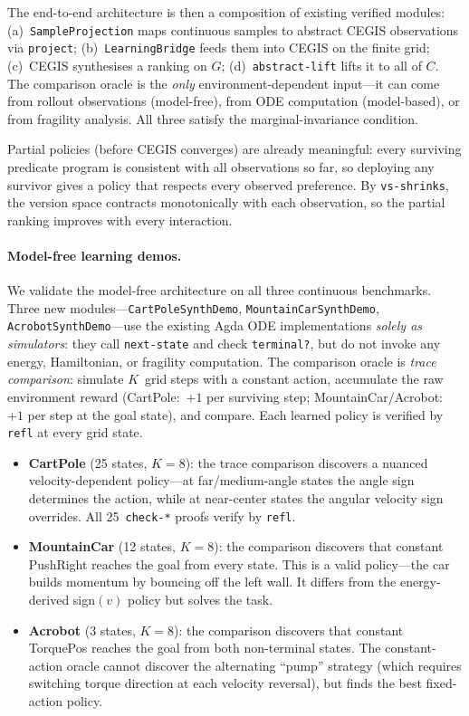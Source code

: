 \documentclass[9pt,a4paper]{article}
\theoremstyle{plain}
\theoremstyle{definition}
\theoremstyle{remark}
\begin{document}
The end-to-end architecture is then a composition of existing verified modules: (a)~\texttt{SampleProjection} maps continuous samples to abstract CEGIS observations via \texttt{project}; (b)~\texttt{LearningBridge} feeds them into CEGIS on the finite grid; (c)~CEGIS synthesises a ranking on $G$; (d)~\texttt{abstract-lift} lifts it to all of $C$.  The comparison oracle is the \emph{only} environment-dependent input---it can come from rollout observations (model-free), from ODE computation (model-based), or from fragility analysis.  All three satisfy the marginal-invariance condition.

Partial policies (before CEGIS converges) are already meaningful: every surviving predicate program is consistent with all observations so far, so deploying any survivor gives a policy that respects every observed preference.  By \texttt{vs-shrinks}, the version space contracts monotonically with each observation, so the partial ranking improves with every interaction.

\paragraph{Model-free learning demos.}
\label{sec:model-free-demos}
We validate the model-free architecture on all three continuous benchmarks.  Three new modules---\texttt{CartPoleSynthDemo}, \texttt{MountainCarSynthDemo}, \texttt{AcrobotSynthDemo}---use the existing Agda ODE implementations \emph{solely as simulators}: they call \texttt{next-state} and check \texttt{terminal?}, but do not invoke any energy, Hamiltonian, or fragility computation.  The comparison oracle is \emph{trace comparison}: simulate $K$~grid steps with a constant action, accumulate the raw environment reward (CartPole:~$+1$ per surviving step; MountainCar/Acrobot:~$+1$ per step at the goal state), and compare.  Each learned policy is verified by \texttt{refl} at every grid state.

\begin{itemize}
\item \textbf{CartPole} (25 states, $K{=}8$): the trace comparison discovers a nuanced velocity-dependent policy---at far/medium-angle states the angle sign determines the action, while at near-center states the angular velocity sign overrides.  All 25~\texttt{check-*} proofs verify by \texttt{refl}.
\item \textbf{MountainCar} (12 states, $K{=}8$): the comparison discovers that constant PushRight reaches the goal from every state.  This is a valid policy---the car builds momentum by bouncing off the left wall.  It differs from the energy-derived sign$(v)$ policy but solves the task.
\item \textbf{Acrobot} (3 states, $K{=}8$): the comparison discovers that constant TorquePos reaches the goal from both non-terminal states.  The constant-action oracle cannot discover the alternating ``pump'' strategy (which requires switching torque direction at each velocity reversal), but finds the best fixed-action policy.
\end{itemize}
\end{document}
